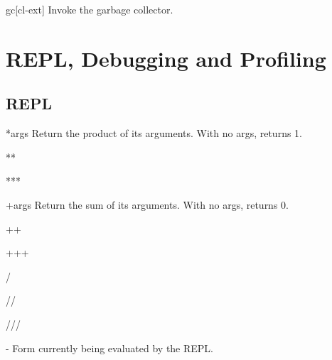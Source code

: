 \documentclass[10pt,english]{book}
\begin{document}
\begin{function}{gc}{}[cl-ext]
  Invoke the garbage collector.
\end{function}


\chapter{REPL, Debugging and Profiling}
\label{cha:debugging-profiling}

\section{REPL}
\label{sec:repl}

\begin{variable}{*}{\rest args}
  Return the product of its arguments. With no args, returns 1.
\end{variable}

\begin{variable}{**}{}
  
\end{variable}

\begin{variable}{***}{}
  
\end{variable}

\begin{variable}{+}{\rest args}
  Return the sum of its arguments. With no args, returns 0.
\end{variable}

\begin{variable}{++}{}
  
\end{variable}

\begin{variable}{+++}{}
  
\end{variable}

\begin{variable}{/}{}
  
\end{variable}

\begin{variable}{//}{}
  
\end{variable}

\begin{variable}{///}{}
  
\end{variable}

\begin{variable}{-}{}
  Form currently being evaluated by the REPL.
\end{variable}
\end{document}
